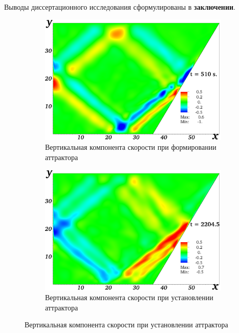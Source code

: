 \documentclass[utf8x]{G7-32} %
\begin{document}
Выводы диссертационного исследования сформулированы в \textbf{заключении}.

\begin{figure}[h!]
  \centering
  \begin{subfigure}[с]{0.45\textwidth}
    \includegraphics[width=1\textwidth]{../pics/H40L60N1ap05dp20w1p63Deltawp05Biharm/2D36x36DiagramH40L60N1ap05dp20w0p63Deltawp3315BiharmVyn01019.png}
    \caption{Вертикальная компонента скорости при формировании аттрактора}
  \end{subfigure}
  \begin{subfigure}[с]{0.45\textwidth}
    \includegraphics[width=1\textwidth]{../pics/H40L60N1ap05dp20w1p63Deltawp05Biharm/2D36x36DiagramH40L60N1ap05dp20w0p63Deltawp3315BiharmVyn04408.png}
    \caption{Вертикальная компонента скорости при установлении аттрактора}
  \end{subfigure}

\end{figure}
\end{document}
